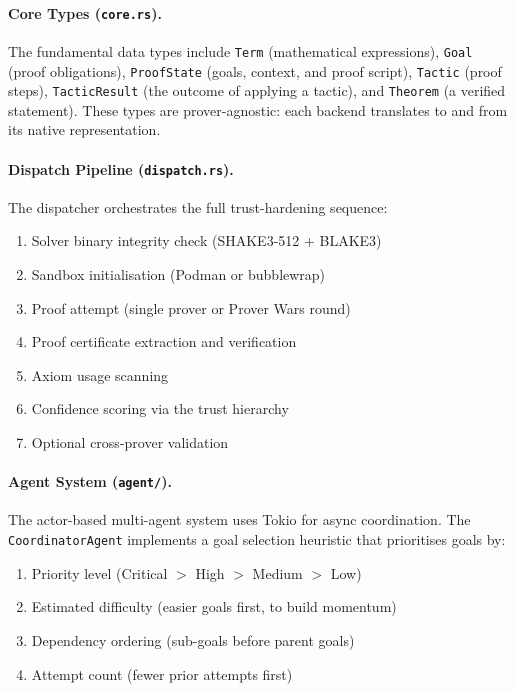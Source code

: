 \documentclass[11pt,a4paper]{article}
\begin{document}
\paragraph{Core Types (\texttt{core.rs}).}
The fundamental data types include \texttt{Term} (mathematical expressions),
\texttt{Goal} (proof obligations), \texttt{ProofState} (goals, context, and
proof script), \texttt{Tactic} (proof steps), \texttt{TacticResult} (the
outcome of applying a tactic), and \texttt{Theorem} (a verified statement).
These types are prover-agnostic: each backend translates to and from its native
representation.

\paragraph{Dispatch Pipeline (\texttt{dispatch.rs}).}
The dispatcher orchestrates the full trust-hardening sequence:
\begin{enumerate}
  \item Solver binary integrity check (SHAKE3-512 + BLAKE3)
  \item Sandbox initialisation (Podman or bubblewrap)
  \item Proof attempt (single prover or Prover Wars round)
  \item Proof certificate extraction and verification
  \item Axiom usage scanning
  \item Confidence scoring via the trust hierarchy
  \item Optional cross-prover validation
\end{enumerate}

\paragraph{Agent System (\texttt{agent/}).}
The actor-based multi-agent system uses Tokio for async coordination. The
\texttt{CoordinatorAgent} implements a goal selection heuristic that
prioritises goals by:
\begin{enumerate}
  \item Priority level (Critical $>$ High $>$ Medium $>$ Low)
  \item Estimated difficulty (easier goals first, to build momentum)
  \item Dependency ordering (sub-goals before parent goals)
  \item Attempt count (fewer prior attempts first)
\end{enumerate}
\end{document}
